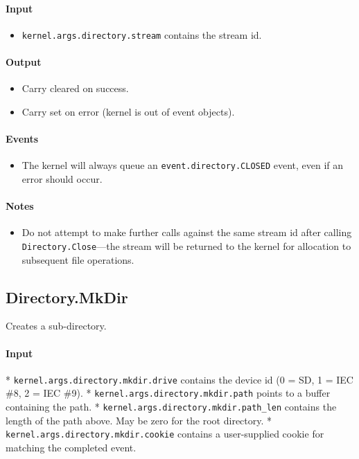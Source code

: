 \paragraph{Input} 
\begin{itemize}
\item \verb+kernel.args.directory.stream+ contains the stream id.
\end{itemize}

\paragraph{Output}
\begin{itemize}
\item Carry cleared on success.
\item Carry set on error (kernel is out of event objects).
\end{itemize}

\paragraph{Events}
\begin{itemize}
\item The kernel will always queue an \verb+event.directory.CLOSED+ event, even if an error should occur.
\end{itemize}

\paragraph{Notes}
\begin{itemize}
\item Do not attempt to make further calls against the same stream id after calling \verb+Directory.Close+---the stream will be returned to the kernel for allocation to subsequent file operations.
\end{itemize}


\subsection*{Directory.MkDir}
Creates a sub-directory.

\paragraph{Input}

* \verb+kernel.args.directory.mkdir.drive+ contains the device id (0 = SD, 1 = IEC \#8, 2 = IEC \#9).
* \verb+kernel.args.directory.mkdir.path+ points to a buffer containing the path.
* \verb+kernel.args.directory.mkdir.path_len+ contains the length of the path above.  May be zero for the root directory.
* \verb+kernel.args.directory.mkdir.cookie+ contains a user-supplied cookie for matching the completed event.

